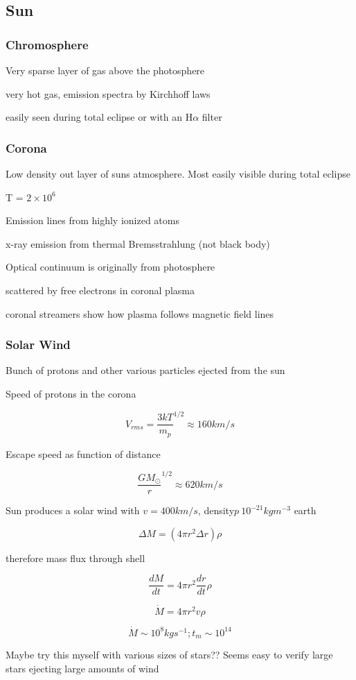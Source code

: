 \documentclass{article}
\begin{document}
\subsection{Sun}
\subsubsection{Chromosphere}
\begin{list}{-}{}
\item Very sparse layer of gas above the photosphere
\item very hot gas, emission spectra by Kirchhoff laws 
\item easily seen during total eclipse or with an H\(\alpha\) filter
\end{list}
\subsubsection{Corona}\begin{list}{-}{}
\item Low density out layer of suns atmosphere. Most easily visible during total eclipse
\item T = \(2\times10^6\)
\item Emission lines from highly ionized atoms
\item x-ray emission from thermal Bremsstrahlung (not black body)
\item Optical continuum is originally from photosphere 
\item scattered by free electrons in coronal plasma 
\item coronal streamers show how plasma follows magnetic field lines
\end{list}
\subsubsection{Solar Wind}
\begin{list}{-}{}
\item Bunch of protons and other various particles ejected from the sun
\item Speed of protons in the corona
\item \[V_{rms} = \frac{3kT}{m_p}^{1/2} \approx 160km/s\]
\item Escape speed as function of distance 
\item \[\frac{GM_\odot}{r}^{1/2} \approx 620 km/s\]
\item Sun produces a solar wind with \(v = 400 km/s\), density\(p ~ 10^{-21} kgm^{-3}\) earth
\item \[\Delta M = (4\pi r^2\Delta r) \rho\]
\item therefore mass flux through shell
\item \[\frac{dM}{dt} = 4\pi r^2 \frac{dr}{dt} \rho\]
\item \[\dot{M} = 4\pi r^2 v \rho\]
\item \[\dot{M} \sim 10^8 kgs^{-1}; t_m \sim 10^{14}\]
\item Maybe try this myself with various sizes of stars?? Seems easy to verify large stars ejecting large amounts of wind
\end{list}
\end{document}
